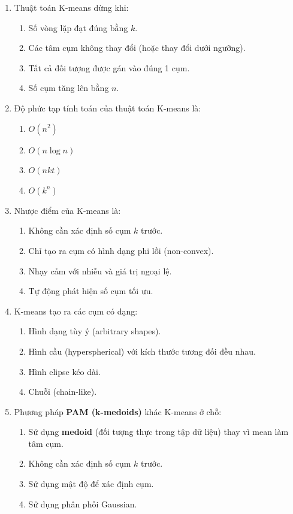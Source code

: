 \documentclass[10pt]{article}
\begin{document}
\begin{enumerate}[leftmargin=*, label=\textbf{Câu \arabic*.}]
    \item Thuật toán K-means dừng khi:
    \begin{enumerate}[label=\Alph*.]
        \item Số vòng lặp đạt đúng bằng $k$.
        \item Các tâm cụm không thay đổi (hoặc thay đổi dưới ngưỡng).
        \item Tất cả đối tượng được gán vào đúng 1 cụm.
        \item Số cụm tăng lên bằng $n$.
    \end{enumerate}

    \item Độ phức tạp tính toán của thuật toán K-means là:
    \begin{enumerate}[label=\Alph*.]
        \item $O(n^2)$
        \item $O(n \log n)$
        \item $O(nkt)$
        \item $O(k^n)$
    \end{enumerate}

    \item Nhược điểm của K-means là:
    \begin{enumerate}[label=\Alph*.]
        \item Không cần xác định số cụm $k$ trước.
        \item Chỉ tạo ra cụm có hình dạng phi lồi (non-convex).
        \item Nhạy cảm với nhiễu và giá trị ngoại lệ.
        \item Tự động phát hiện số cụm tối ưu.
    \end{enumerate}

    \item K-means tạo ra các cụm có dạng:
    \begin{enumerate}[label=\Alph*.]
        \item Hình dạng tùy ý (arbitrary shapes).
        \item Hình cầu (hyperspherical) với kích thước tương đối đều nhau.
        \item Hình elipse kéo dài.
        \item Chuỗi (chain-like).
    \end{enumerate}

    \item Phương pháp \textbf{PAM (k-medoids)} khác K-means ở chỗ:
    \begin{enumerate}[label=\Alph*.]
        \item Sử dụng \textbf{medoid} (đối tượng thực trong tập dữ liệu) thay vì mean làm tâm cụm.
        \item Không cần xác định số cụm $k$ trước.
        \item Sử dụng mật độ để xác định cụm.
        \item Sử dụng phân phối Gaussian.
    \end{enumerate}


\end{enumerate}
\end{document}
